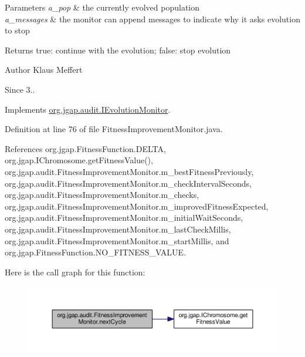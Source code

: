 \begin{DoxyParams}{Parameters}
{\em a\-\_\-pop} & the currently evolved population \\
\hline
{\em a\-\_\-messages} & the monitor can append messages to indicate why it asks evolution to stop \\
\hline
\end{DoxyParams}
\begin{DoxyReturn}{Returns}
true\-: continue with the evolution; false\-: stop evolution
\end{DoxyReturn}
\begin{DoxyAuthor}{Author}
Klaus Meffert 
\end{DoxyAuthor}
\begin{DoxySince}{Since}
3.. 
\end{DoxySince}


Implements \hyperlink{interfaceorg_1_1jgap_1_1audit_1_1_i_evolution_monitor_a564db6ed7124c706e5828c3ef1e1be82}{org.\-jgap.\-audit.\-I\-Evolution\-Monitor}.



Definition at line 76 of file Fitness\-Improvement\-Monitor.\-java.



References org.\-jgap.\-Fitness\-Function.\-D\-E\-L\-T\-A, org.\-jgap.\-I\-Chromosome.\-get\-Fitness\-Value(), org.\-jgap.\-audit.\-Fitness\-Improvement\-Monitor.\-m\-\_\-best\-Fitness\-Previously, org.\-jgap.\-audit.\-Fitness\-Improvement\-Monitor.\-m\-\_\-check\-Interval\-Seconds, org.\-jgap.\-audit.\-Fitness\-Improvement\-Monitor.\-m\-\_\-checks, org.\-jgap.\-audit.\-Fitness\-Improvement\-Monitor.\-m\-\_\-improved\-Fitness\-Expected, org.\-jgap.\-audit.\-Fitness\-Improvement\-Monitor.\-m\-\_\-initial\-Wait\-Seconds, org.\-jgap.\-audit.\-Fitness\-Improvement\-Monitor.\-m\-\_\-last\-Check\-Millis, org.\-jgap.\-audit.\-Fitness\-Improvement\-Monitor.\-m\-\_\-start\-Millis, and org.\-jgap.\-Fitness\-Function.\-N\-O\-\_\-\-F\-I\-T\-N\-E\-S\-S\-\_\-\-V\-A\-L\-U\-E.



Here is the call graph for this function\-:
\nopagebreak
\begin{figure}[H]
\begin{center}
\leavevmode
\includegraphics[width=350pt]{classorg_1_1jgap_1_1audit_1_1_fitness_improvement_monitor_a0d58e057a3bd7dfb3c71d97ac1840e3c_cgraph}
\end{center}
\end{figure}


